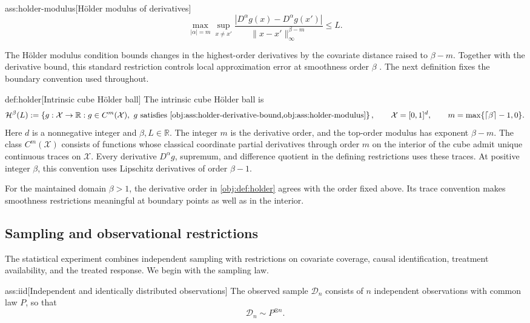 \documentclass[11pt]{article}
\begin{document}
\begin{assumptionv}{ass:holder-modulus}[Hölder modulus of derivatives]
\[
\max_{|\alpha|=m}\sup_{x\ne x'}
\frac{|D^\alpha g(x)-D^\alpha g(x')|}
{\|x-x'\|_\infty^{\beta-m}}
\le L.
\]
\end{assumptionv}

The Hölder modulus condition bounds changes in the highest-order derivatives by the covariate distance raised to \(\beta-m\). Together with the derivative bound, this standard restriction controls local approximation error at smoothness order \(\beta\) \citep{Dorn2026GlobalOverlap}. The next definition fixes the boundary convention used throughout.

\begin{definitionv}{def:holder}[Intrinsic cube Hölder ball]
The intrinsic cube Hölder ball is
\[
\mathcal H^\beta(L)
:=
\left\{
g:\mathcal X\to\mathbb R:
g\in C^m(\mathcal X),\
g\text{ satisfies }\cref{obj:ass:holder-derivative-bound,obj:ass:holder-modulus}
\right\},
\qquad
\mathcal X=[0,1]^d,
\qquad
m=\max\{\lceil\beta\rceil-1,0\}.
\]
Here \(d\) is a nonnegative integer and \(\beta,L\in\mathbb R\). The integer \(m\) is the derivative order, and the top-order modulus has exponent \(\beta-m\). The class \(C^m(\mathcal X)\) consists of functions whose classical coordinate partial derivatives through order \(m\) on the interior of the cube admit unique continuous traces on \(\mathcal X\). Every derivative \(D^\alpha g\), supremum, and difference quotient in the defining restrictions uses these traces. At positive integer \(\beta\), this convention uses Lipschitz derivatives of order \(\beta-1\).
\end{definitionv}

For the maintained domain \(\beta>1\), the derivative order in \cref{obj:def:holder} agrees with the order fixed above. Its trace convention makes smoothness restrictions meaningful at boundary points as well as in the interior.

\subsection{Sampling and observational restrictions}

The statistical experiment combines independent sampling with restrictions on covariate coverage, causal identification, treatment availability, and the treated response. We begin with the sampling law.

\begin{assumptionv}{ass:iid}[Independent and identically distributed observations]
The observed sample \(\mathcal D_n\) consists of \(n\) independent observations with common law \(P\), so that
\[
\mathcal D_n\sim P^{\otimes n}.
\]
\end{assumptionv}
\end{document}
